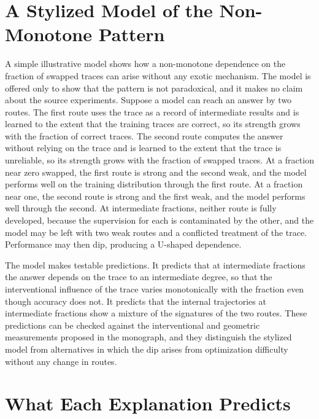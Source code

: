 \section{A Stylized Model of the Non-Monotone Pattern}

A simple illustrative model shows how a non-monotone dependence on the fraction of swapped traces can arise without any exotic mechanism. The model is offered only to show that the pattern is not paradoxical, and it makes no claim about the source experiments. Suppose a model can reach an answer by two routes. The first route uses the trace as a record of intermediate results and is learned to the extent that the training traces are correct, so its strength grows with the fraction of correct traces. The second route computes the answer without relying on the trace and is learned to the extent that the trace is unreliable, so its strength grows with the fraction of swapped traces. At a fraction near zero swapped, the first route is strong and the second weak, and the model performs well on the training distribution through the first route. At a fraction near one, the second route is strong and the first weak, and the model performs well through the second. At intermediate fractions, neither route is fully developed, because the supervision for each is contaminated by the other, and the model may be left with two weak routes and a conflicted treatment of the trace. Performance may then dip, producing a U-shaped dependence.

The model makes testable predictions. It predicts that at intermediate fractions the answer depends on the trace to an intermediate degree, so that the interventional influence of the trace varies monotonically with the fraction even though accuracy does not. It predicts that the internal trajectories at intermediate fractions show a mixture of the signatures of the two routes. These predictions can be checked against the interventional and geometric measurements proposed in the monograph, and they distinguish the stylized model from alternatives in which the dip arises from optimization difficulty without any change in routes.

\section{What Each Explanation Predicts}


